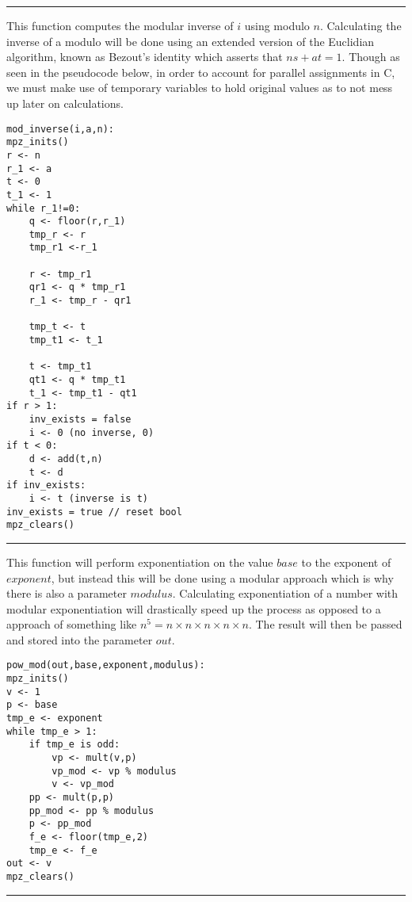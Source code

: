 \documentclass[
	12pt, %
]{fphw}
\begin{document}
\noindent\rule{6.3in}{0.4pt}
This function computes the modular inverse of $i$ using modulo $n$. Calculating the inverse of a modulo will be done using an extended version of the Euclidian algorithm, known as Bezout's identity which asserts that $ns + at = 1$. Though as seen in the pseudocode below, in order to account for parallel assignments in C, we must make use of temporary variables to hold original values as to not mess up later on calculations.
\begin{lstlisting}[mathescape=true]
mod_inverse(i,a,n):
mpz_inits()
r <- n
r_1 <- a
t <- 0
t_1 <- 1
while r_1!=0:
	q <- floor(r,r_1)
	tmp_r <- r
	tmp_r1 <-r_1
	
	r <- tmp_r1
	qr1 <- q * tmp_r1
	r_1 <- tmp_r - qr1
	
	tmp_t <- t
	tmp_t1 <- t_1
	
	t <- tmp_t1
	qt1 <- q * tmp_t1
	t_1 <- tmp_t1 - qt1
if r > 1:
	inv_exists = false
	i <- 0 (no inverse, 0)
if t < 0:
	d <- add(t,n)
	t <- d
if inv_exists:
	i <- t (inverse is t)
inv_exists = true // reset bool
mpz_clears()
\end{lstlisting}

\noindent\rule{6.3in}{0.4pt}

This function will perform exponentiation on the value $base$ to the exponent of $exponent$, but instead this will be done using a modular approach which is why there is also a parameter $modulus$. Calculating exponentiation of a number with modular exponentiation will drastically speed up the process as opposed to a approach of something like $n^5 = n \times n \times n \times n \times n$. The result will then be passed and stored into the parameter $out$.
\begin{lstlisting}[mathescape=true]
pow_mod(out,base,exponent,modulus):
mpz_inits()
v <- 1
p <- base
tmp_e <- exponent
while tmp_e > 1:
	if tmp_e is odd:
		vp <- mult(v,p)
		vp_mod <- vp % modulus
		v <- vp_mod
	pp <- mult(p,p)
	pp_mod <- pp % modulus
	p <- pp_mod
	f_e <- floor(tmp_e,2)
	tmp_e <- f_e
out <- v
mpz_clears()
\end{lstlisting}

\noindent\rule{6.3in}{0.4pt}
\end{document}
